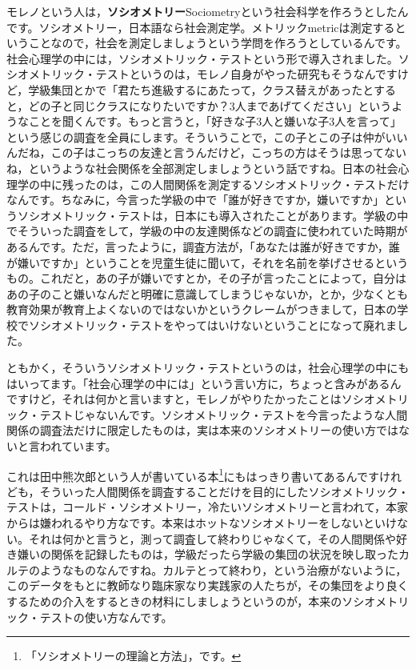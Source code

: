 \documentclass{ltjsbook}
\begin{document}
モレノという人は，\textbf{ソシオメトリー}Sociometryという社会科学を作ろうとしたんです。ソシオメトリー，日本語なら社会測定学。メトリックmetricは測定するということなので，社会を測定しましょうという学問を作ろうとしているんです。社会心理学の中には，ソシオメトリック・テストという形で導入されました。ソシオメトリック・テストというのは，モレノ自身がやった研究もそうなんですけど，学級集団とかで「君たち進級するにあたって，クラス替えがあったとすると，どの子と同じクラスになりたいですか？3人まであげてください」というようなことを聞くんです。もっと言うと，「好きな子3人と嫌いな子3人を言って」という感じの調査を全員にします。そういうことで，この子とこの子は仲がいいんだね，この子はこっちの友達と言うんだけど，こっちの方はそうは思ってないね，というような社会関係を全部測定しましょうという話ですね。日本の社会心理学の中に残ったのは，この人間関係を測定するソシオメトリック・テストだけなんです。ちなみに，今言った学級の中で「誰が好きですか，嫌いですか」というソシオメトリック・テストは，日本にも導入されたことがあります。学級の中でそういった調査をして，学級の中の友達関係などの調査に使われていた時期があるんです。ただ，言ったように，調査方法が，「あなたは誰が好きですか，誰が嫌いですか」ということを児童生徒に聞いて，それを名前を挙げさせるというもの。これだと，あの子が嫌いですとか，その子が言ったことによって，自分はあの子のこと嫌いなんだと明確に意識してしまうじゃないか，とか，少なくとも教育効果が教育上よくないのではないかというクレームがつきまして，日本の学校でソシオメトリック・テストをやってはいけないということになって廃れました。

ともかく，そういうソシオメトリック・テストというのは，社会心理学の中にもはいってます。「社会心理学の中には」という言い方に，ちょっと含みがあるんですけど，それは何かと言いますと，モレノがやりたかったことはソシオメトリック・テストじゃないんです。ソシオメトリック・テストを今言ったような人間関係の調査法だけに限定したものは，実は本来のソシオメトリーの使い方ではないと言われています。

これは田中熊次郎という人が書いている本\footnote{「ソシオメトリーの理論と方法」，\textcite{TanakaKumajiro}です。}にもはっきり書いてあるんですけれども，そういった人間関係を調査することだけを目的にしたソシオメトリック・テストは，コールド・ソシオメトリー，冷たいソシオメトリーと言われて，本家からは嫌われるやり方なです。本来はホットなソシオメトリーをしないといけない。それは何かと言うと，測って調査して終わりじゃなくて，その人間関係や好き嫌いの関係を記録したものは，学級だったら学級の集団の状況を映し取ったカルテのようなものなんですね。カルテとって終わり，という治療がないように，このデータをもとに教師なり臨床家なり実践家の人たちが，その集団をより良くするための介入をするときの材料にしましょうというのが，本来のソシオメトリック・テストの使い方なんです。
\end{document}
